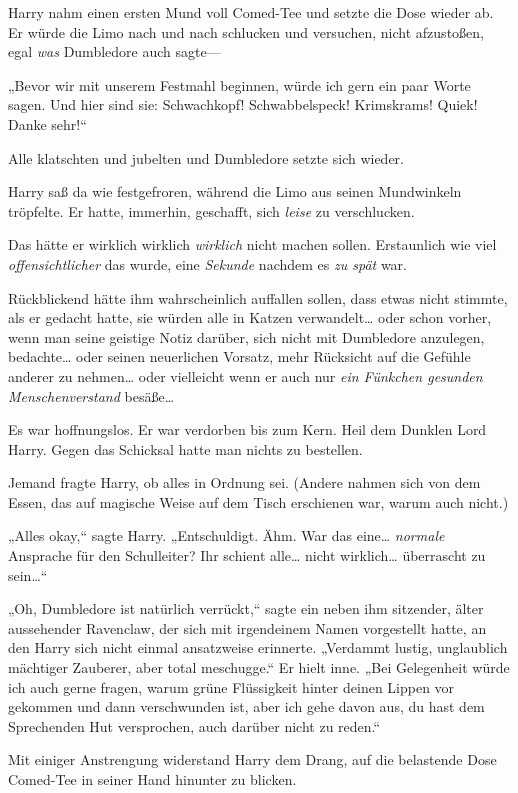 {Harry nahm einen ersten Mund voll Comed-Tee und setzte die Dose wieder ab. Er würde die Limo nach und nach schlucken und versuchen, nicht afzustoßen, egal \emph{was} Dumbledore auch sagte—

„Bevor wir mit unserem Festmahl beginnen, würde ich gern ein paar Worte sagen. Und hier sind sie: Schwachkopf! Schwabbelspeck! Krimskrams! Quiek! Danke sehr!“

Alle klatschten und jubelten und Dumbledore setzte sich wieder.

Harry saß da wie festgefroren, während die Limo aus seinen Mundwinkeln tröpfelte. Er hatte, immerhin, geschafft, sich \emph{leise} zu verschlucken.

Das hätte er wirklich wirklich \emph{wirklich} nicht machen sollen. Erstaunlich wie viel \emph{offensichtlicher} das wurde, eine \emph{Sekunde} nachdem es \emph{zu spät} war.

Rückblickend hätte ihm wahrscheinlich auffallen sollen, dass etwas nicht stimmte, als er gedacht hatte, sie würden alle in Katzen verwandelt… oder schon vorher, wenn man seine geistige Notiz darüber, sich nicht mit Dumbledore anzulegen, bedachte… oder seinen neuerlichen Vorsatz, mehr Rücksicht auf die Gefühle anderer zu nehmen… oder vielleicht wenn er auch nur \emph{ein Fünkchen gesunden Menschenverstand} besäße…

Es war hoffnungslos. Er war verdorben bis zum Kern. Heil dem Dunklen Lord Harry. Gegen das Schicksal hatte man nichts zu bestellen.

Jemand fragte Harry, ob alles in Ordnung sei. (Andere nahmen sich von dem Essen, das auf magische Weise auf dem Tisch erschienen war, warum auch nicht.)

„Alles okay,“ sagte Harry. „Entschuldigt. Ähm. War das eine… \emph{normale} Ansprache für den Schulleiter? Ihr schient alle… nicht wirklich… überrascht zu sein…“

„Oh, Dumbledore ist natürlich verrückt,“ sagte ein neben ihm sitzender, älter aussehender Ravenclaw, der sich mit irgendeinem Namen vorgestellt hatte, an den Harry sich nicht einmal ansatzweise erinnerte. „Verdammt lustig, unglaublich mächtiger Zauberer, aber total meschugge.“ Er hielt inne. „Bei Gelegenheit würde ich auch gerne fragen, warum grüne Flüssigkeit hinter deinen Lippen vor gekommen und dann verschwunden ist, aber ich gehe davon aus, du hast dem Sprechenden Hut versprochen, auch darüber nicht zu reden.“

Mit einiger Anstrengung widerstand Harry dem Drang, auf die belastende Dose Comed-Tee in seiner Hand hinunter zu blicken.

}
